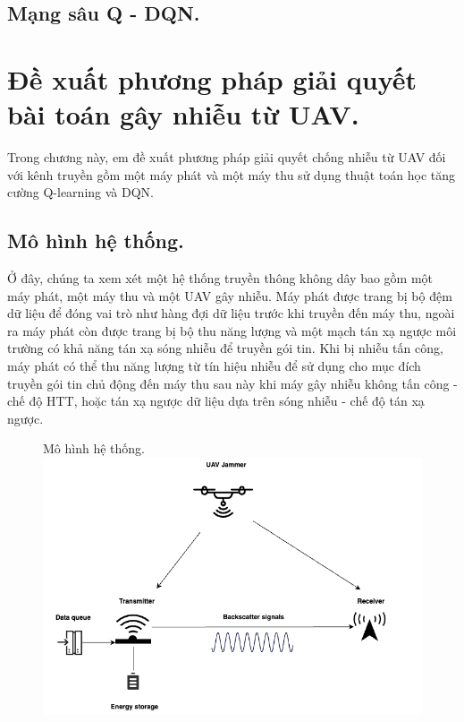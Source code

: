 \documentclass{uetgraduation}
\begin{document}
\section{Mạng sâu Q - DQN.}

\chapter{Đề xuất phương pháp giải quyết bài toán gây nhiễu từ UAV.}
Trong chương này, em đề xuất phương pháp giải quyết chống nhiễu từ UAV đối với kênh truyền gồm một máy phát và một máy thu sử dụng thuật toán học tăng cường Q-learning và DQN.


\section{Mô hình hệ thống.}
Ở đây, chúng ta xem xét một hệ thống truyền thông không dây bao gồm một máy phát, một máy thu và một UAV gây nhiễu. Máy phát được trang bị bộ đệm dữ liệu để đóng vai trò như hàng đợi dữ 
liệu trước khi truyền đến máy thu, ngoài ra máy phát còn được trang bị bộ thu năng lượng và một mạch tán xạ ngược môi trường có khả năng tán xạ sóng nhiễu để truyền gói tin. Khi bị nhiễu
tấn công, máy phát có thể thu năng lượng từ tín hiệu nhiễu để sử dụng cho mục đích truyền gói tin chủ
động đến máy thu sau này khi máy gây nhiễu không tấn công - chế độ HTT, hoặc tán xạ ngược dữ liệu dựa trên sóng nhiễu - chế độ tán xạ ngược.

\begin{figure}{Mô hình hệ thống.}
    \centering
    \includegraphics[scale=0.5]{system_model}
    \label{fig:system_model}
\end{figure}
\end{document}
